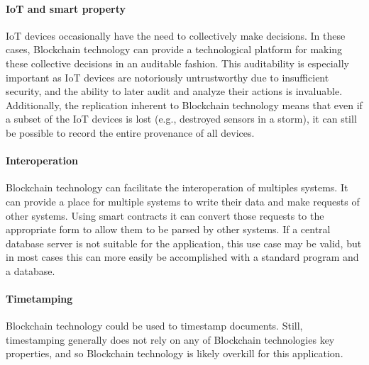 \paragraph{IoT and smart property}
IoT devices occasionally have the need to collectively make decisions.
In these cases, Blockchain technology can provide a technological platform for making these collective decisions in an auditable fashion.
This auditability is especially important as IoT devices are notoriously untrustworthy due to insufficient security, and the ability to later audit and analyze their actions is invaluable.
Additionally, the replication inherent to Blockchain technology means that even if a subset of the IoT devices is lost (e.g., destroyed sensors in a storm), it can still be possible to record the entire provenance of all devices.

\paragraph{Interoperation}
Blockchain technology can facilitate the interoperation of multiples systems.
It can provide a place for multiple systems to write their data and make requests of other systems.
Using smart contracts it can convert those requests to the appropriate form to allow them to be parsed by other systems.
If a central database server is not suitable for the application, this use case may be valid, but in most cases this can more easily be accomplished with a standard program and a database.

\paragraph{Timetamping}
Blockchain technology could be used to timestamp documents. Still, timestamping generally does not rely on any of Blockchain technologies key properties, and so Blockchain technology is likely overkill for this application.